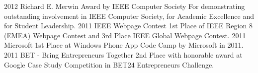 \documentclass[]{friggeri-cv}
\begin{document}
\begin{entrylist}
  \entry
    {2012}
    {Richard E. Merwin Award by IEEE Computer Society}
    {}
    {For demonstrating outstanding involvement in IEEE Computer Society, for Academic Excellence and for Student Leadership.}
  \entry
    {2011}
    {IEEE Webpage Contest}
    { }
    {1st Place of IEEE Region 8 (EMEA) Webpage Contest and 3rd Place IEEE Global Webpage Contest.}
  \entry
    {2011}
    {Microsoft}
    {}
    {1st Place at Windows Phone App Code Camp by Microsoft in 2011.}
  \entry
    {2011}
    {BET - Bring Entrepreneurs Together}
    {}
    {2nd Place with honorable award at Google Case Study Competition in BET24 Entrepreneurs Challenge.}    
\end{entrylist}

\end{document}
